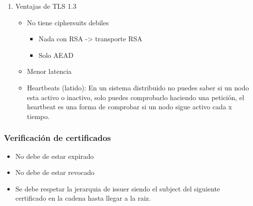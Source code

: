 \documentclass[11pt]{article}
\begin{document}
\begin{enumerate}
\begin{enumerate}
\begin{itemize}
\item Http
\begin{itemize}
\item Es un protocolo peticion-respuesta
\item La cantidad de interacciones peticion-respuesta hay una sesion http es de una por sesion.
\end{itemize}

\item MiM en TLS
\begin{itemize}
\item Cliente manda su hello que incluye la lista de cipher suite soportados
\item Un tercero altera la lista de cipher suits dejando solo las debiles
\item La forma de mitigacion es verificar el finished del handshake el hash de todo lo que se ha transmitido.

\item Verificar certificados
\item Verificar identidad -> reto-respuesta
\end{itemize}

\item La criptografia es segura siempre y cuando no se comprometan los secretos
\item Tiempo promedio para detectar una brecha es de 6 meses a 1 año.
\end{itemize}
\end{enumerate}
\item Ventajas de TLS 1.3
\label{sec:org0d51e2f}
\begin{itemize}
\item No tiene ciphersuits debiles
\begin{itemize}
\item Nada con RSA -> transporte RSA
\item Solo AEAD
\end{itemize}
\item Menor latencia

\item Heartbeats (latido): En un sistema distribuido no puedes saber si un nodo esta activo o inactivo, solo puedes comprobarlo haciendo una petición, el heartbeat es una forma de comprobar si un nodo sigue activo cada x tiempo.
\end{itemize}
\end{enumerate}
\subsubsection{Verificación de certificados}
\label{sec:orgc3f06b1}
\begin{itemize}
\item No debe de estar expirado
\item No debe de estar revocado
\item Se debe respetar la jerarquia de issuer siendo el subject del siguiente certificado en la cadena hasta llegar a la raiz.
\end{itemize}
\end{document}
